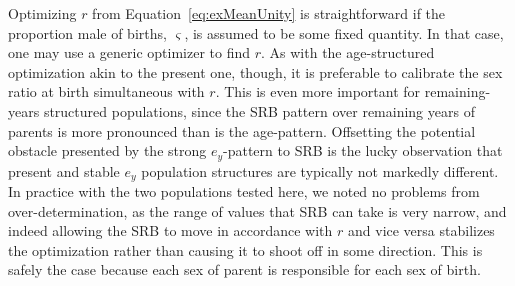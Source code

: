 \label{sec:schoenexiterative}
Optimizing $r$ from Equation~\eqref{eq:exMeanUnity} is straightforward if the
proportion male of births, $\varsigma$, is assumed to be some fixed quantity.
In that case, one may use a generic optimizer to find $r$. As with the
age-structured optimization akin to the present one, though, it is preferable to
calibrate the sex ratio at birth simultaneous with $r$. This is even more
important for remaining-years structured populations, since the SRB pattern over
remaining years of parents is more pronounced than is the age-pattern.
Offsetting the potential obstacle presented by the strong $e_y$-pattern to SRB
is the lucky observation that present and stable $e_y$ population structures are
typically not markedly different. In practice with the two populations tested
here, we noted no problems from over-determination, as the range of values
that SRB can take is very narrow, and indeed allowing the SRB to move in accordance
with $r$ and vice versa stabilizes the optimization rather than causing it to
shoot off in some direction. This is safely the case because each sex of parent
is responsible for each sex of birth.

